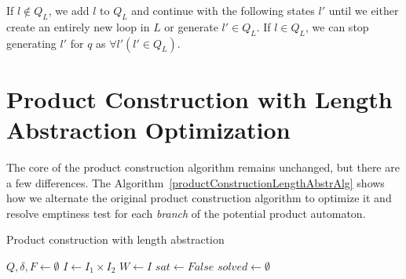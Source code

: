 If $l \notin Q_L$, we add $l$ to $Q_L$ and continue with the following states $l'$ until we either create an entirely new loop in $L$ or generate $l' \in Q_L$. If $l \in Q_L$, we can stop generating $l'$ for $q$ as $\forall l' ( l' \in Q_L)$.

\section{Product Construction with Length Abstraction Optimization}

The core of the product construction algorithm remains unchanged, but there are a few differences. The Algorithm~\ref{productConstructionLengthAbstrAlg} shows how we alternate the original product construction algorithm to optimize it and resolve emptiness test for each \emph{branch} of the potential product automaton.

\begin{algorithm}
\caption{Product construction with length abstraction}\label{productConstructionLengthAbstrAlg}
\DontPrintSemicolon
{}
\BlankLine
$Q, \delta, F \gets \emptyset$ \;
$I \gets I_1 \times I_2$ \;
$W \gets I$ \;\label{work_set}
$sat \gets False$ \;\label{sat}
$solved \gets \emptyset$ \;\label{solved}
\end{algorithm}\DecMargin{1em}

